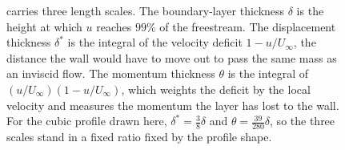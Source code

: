\begin{figure}[htbp]
{carries three length scales. The boundary-layer thickness $\delta$ is the
height at which $u$ reaches $99\%$ of the freestream. The displacement
thickness $\delta^*$ is the integral of the velocity deficit $1-u/U_\infty$,
the distance the wall would have to move out to pass the same mass as an
inviscid flow. The momentum thickness $\theta$ is the integral of
$(u/U_\infty)(1-u/U_\infty)$, which weights the deficit by the local velocity
and measures the momentum the layer has lost to the wall. For the cubic profile
drawn here, $\delta^*=\tfrac38\delta$ and $\theta=\tfrac{39}{280}\delta$, so the
three scales stand in a fixed ratio fixed by the profile shape.}
\label{fig:vol03ch12:thicknesses}
\end{figure}
